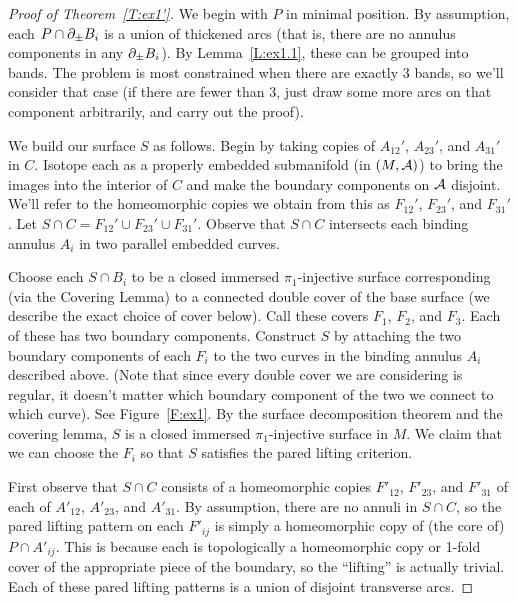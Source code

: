 \begin{proof}[Proof of Theorem~\ref{T:ex1'}]

We begin with $P$ in minimal position. By assumption, each $P \cap \partial_\pm B_i$
is a union of thickened arcs (that is, there are no annulus components in any
$\partial_\pm B_i$). By Lemma~\ref{L:ex1.1}, these can be grouped into bands. The
problem is most constrained when there are exactly 3 bands, so we'll consider
that case (if there are fewer than 3, just draw some more arcs on that
component arbitrarily, and carry out the proof).

We build our surface $S$ as follows. Begin by taking copies of  $A_{12}'$,
$A_{23}'$, and $A_{31}'$ in $C$. Isotope each as a properly embedded
submanifold (in $(M,\mathcal{A})$) to bring the images into the interior of $C$ and
make the boundary components on $\mathcal{A}$ disjoint. We'll refer to the homeomorphic
copies we obtain from this as $F_{12}'$, $F_{23}'$, and $F_{31}'$. Let $S\cap
C = F_{12}' \cup F_{23}' \cup F_{31}'$. Observe that $S\cap C$ intersects each
binding annulus $A_i$ in two parallel embedded curves.

Choose each $S \cap B_i$ to be a closed immersed $\pi_1$-injective surface
corresponding (via the Covering Lemma) to a connected double cover of the base
surface (we describe the exact choice of cover below). Call these covers $F_1$,
$F_2$, and $F_3$.  Each of these has two boundary components. Construct $S$ by
attaching the two boundary components of each $F_i$ to the two curves in the
binding annulus $A_i$ described above. (Note that since every double cover we
are considering is regular, it doesn't matter which boundary component of the
two we connect to which curve). See Figure~\ref{F:ex1}. By the surface
decomposition theorem and the covering lemma, $S$ is a closed immersed
$\pi_1$-injective surface in $M$.  We claim that we can choose the $F_i$ so
that $S$ satisfies the pared lifting criterion.


First observe that $S \cap C$ consists of a homeomorphic copies $F'_{12}$,
$F'_{23}$, and $F'_{31}$ of each of $A'_{12}$, $A'_{23}$, and $A'_{31}$. By
assumption, there are no annuli in $S \cap C$, so the pared lifting pattern on
each $F'_{ij}$ is simply a homeomorphic copy of (the core of) $P \cap A'_{ij}$.
This is because each is topologically a homeomorphic copy or 1-fold cover of
the appropriate piece of the boundary, so the ``lifting'' is actually trivial.
Each of these pared lifting patterns is a union of disjoint transverse arcs.


\end{proof}
